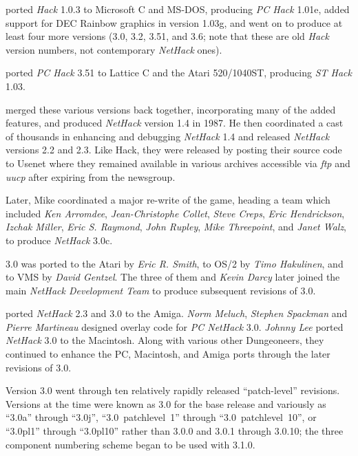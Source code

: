\medskip
{} ported {\it Hack\/} 1.0.3 to Microsoft C and MS-DOS,
producing {\it PC Hack\/} 1.01e, added support for DEC Rainbow graphics in
version 1.03g, and went on to produce at least four more versions (3.0, 3.2,
3.51, and 3.6;
note that these are old {\it Hack\/} version numbers, not contemporary
{\it NetHack\/} ones).

\medskip
{} ported {\it PC Hack\/} 3.51 to Lattice C and the Atari
520/1040ST, producing {\it ST Hack\/} 1.03.

\medskip
{} merged these various versions back together,
incorporating many of the added features, and produced {\it NetHack\/} version
1.4 in 1987.
He then coordinated a cast of thousands in enhancing and debugging
{\it NetHack\/} 1.4 and released {\it NetHack\/} versions 2.2 and 2.3.
Like Hack, they were released by posting their source code to Usenet where
they remained available in various archives accessible
via {\it ftp\/} and {\it uucp\/} after expiring from the newsgroup.

\medskip
\nd Later, Mike coordinated a major re-write of the game, heading a team which
included {\it Ken Arromdee}, {\it Jean-Christophe Collet}, {\it Steve Creps},
{\it Eric Hendrickson}, {\it Izchak Miller}, {\it Eric S. Raymond}, {\it John
Rupley}, {\it Mike Threepoint}, and {\it Janet Walz}, to produce
{\it NetHack\/} 3.0c.

\medskip
{} 3.0 was ported to the Atari by {\it Eric R. Smith}, to OS/2 by
{\it Timo Hakulinen}, and to VMS by {\it David Gentzel}.  The three of them
and {\it Kevin Darcy\/} later joined the main {\it NetHack Development Team} to produce
subsequent revisions of 3.0.

\medskip
{} ported {\it NetHack\/} 2.3 and 3.0 to the Amiga.  {\it
Norm Meluch}, {\it Stephen Spackman\/} and {\it Pierre Martineau\/} designed
overlay code for {\it PC NetHack\/} 3.0.  {\it Johnny Lee\/} ported {\it
NetHack\/} 3.0 to the Macintosh.  Along with various other Dungeoneers, they
continued to enhance the PC, Macintosh, and Amiga ports through the later
revisions of 3.0.

Version 3.0 went through ten relatively rapidly released ``patch-level''
revisions.
Versions at the time were known as 3.0 for the base release and variously
as ``3.0a'' through ``3.0j'',
``3.0~patchlevel~1'' through ``3.0~patchlevel~10'',
or ``3.0pl1'' through ``3.0pl10''
rather than 3.0.0 and 3.0.1 through 3.0.10;
the three component numbering scheme began to be used with 3.1.0.

